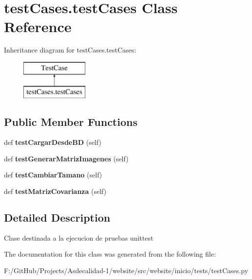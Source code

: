 \hypertarget{classtest_cases_1_1test_cases}{}\section{test\+Cases.\+test\+Cases Class Reference}
\label{classtest_cases_1_1test_cases}
Inheritance diagram for test\+Cases.\+test\+Cases\+:\begin{figure}[H]
\begin{center}
\leavevmode
\includegraphics[height=2.000000cm]{classtest_cases_1_1test_cases}
\end{center}
\end{figure}
\subsection*{Public Member Functions}
\begin{DoxyCompactItemize}
\item 
\mbox{\label{classtest_cases_1_1test_cases_aa979286944bac3542084f99f45ddd45b}} 
def {\bfseries test\+Cargar\+Desde\+BD} (self)
\item 
\mbox{\label{classtest_cases_1_1test_cases_a6f02655300cb85c1ff3b3b8f5921f0a1}} 
def {\bfseries test\+Generar\+Matriz\+Imagenes} (self)
\item 
\mbox{\label{classtest_cases_1_1test_cases_a30fc99af58abaf329f8ce70d41273f7a}} 
def {\bfseries test\+Cambiar\+Tamano} (self)
\item 
\mbox{\label{classtest_cases_1_1test_cases_a59a34e3f0fc3f26697cfedcca798968a}} 
def {\bfseries test\+Matriz\+Covarianza} (self)
\end{DoxyCompactItemize}


\subsection{Detailed Description}
\begin{DoxyVerb}Clase destinada a la ejecucion de pruebas unittest
\end{DoxyVerb}
 

The documentation for this class was generated from the following file\+:\begin{DoxyCompactItemize}
\item 
F\+:/\+Git\+Hub/\+Projects/\+Asdecalidad-\/1/website/src/website/inicio/tests/test\+Cases.\+py\end{DoxyCompactItemize}
